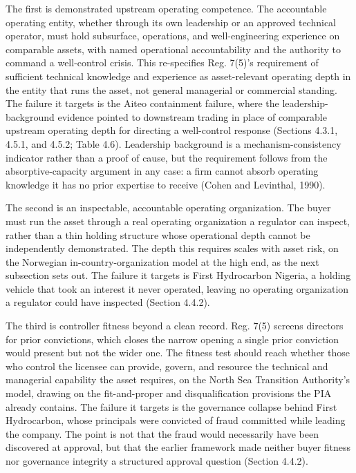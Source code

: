 \documentclass[twoside,fontset=lmodern]{mitthesis}
\begin{document}
The first is demonstrated upstream operating competence. The accountable
operating entity, whether through its own leadership or an approved
technical operator, must hold subsurface, operations, and
well-engineering experience on comparable assets, with named operational
accountability and the authority to command a well-control crisis. This
re-specifies Reg. 7(5)'s requirement of sufficient technical knowledge
and experience as asset-relevant operating depth in the entity that runs
the asset, not general managerial or commercial standing. The failure it
targets is the Aiteo containment failure, where the
leadership-background evidence pointed to downstream trading in place of
comparable upstream operating depth for directing a well-control
response (Sections 4.3.1, 4.5.1, and 4.5.2; Table 4.6). Leadership
background is a mechanism-consistency indicator rather than a proof of
cause, but the requirement follows from the absorptive-capacity argument
in any case: a firm cannot absorb operating knowledge it has no prior
expertise to receive (Cohen and Levinthal, 1990).

The second is an inspectable, accountable operating organization. The
buyer must run the asset through a real operating organization a
regulator can inspect, rather than a thin holding structure whose
operational depth cannot be independently demonstrated. The depth this
requires scales with asset risk, on the Norwegian
in-country-organization model at the high end, as the next subsection
sets out. The failure it targets is First Hydrocarbon Nigeria, a holding
vehicle that took an interest it never operated, leaving no operating
organization a regulator could have inspected (Section 4.4.2).

The third is controller fitness beyond a clean record. Reg. 7(5) screens
directors for prior convictions, which closes the narrow opening a
single prior conviction would present but not the wider one. The fitness
test should reach whether those who control the licensee can provide,
govern, and resource the technical and managerial capability the asset
requires, on the North Sea Transition Authority's model, drawing on the
fit-and-proper and disqualification provisions the PIA already contains.
The failure it targets is the governance collapse behind First
Hydrocarbon, whose principals were convicted of fraud committed while
leading the company. The point is not that the fraud would necessarily
have been discovered at approval, but that the earlier framework made
neither buyer fitness nor governance integrity a structured approval
question (Section 4.4.2).
\end{document}

